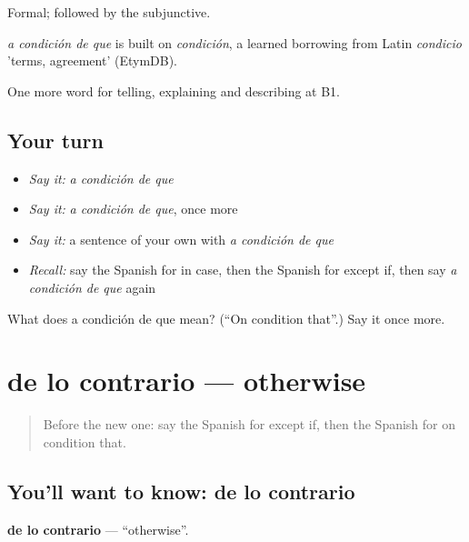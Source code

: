 Formal; followed by the subjunctive.

\begin{cousinweb}
\emph{a condición de que} is built on \emph{condición}, a learned borrowing from Latin \emph{condicio} 'terms, agreement' (EtymDB).
\end{cousinweb}

\begin{grammarlens}[title={What you've built}]
One more word for telling, explaining and describing at B1.
\end{grammarlens}

\subsection*{Your turn}
\begin{itemize}
\raggedright
  \item \emph{Say it:} \emph{a condición de que}
  \item \emph{Say it:} \emph{a condición de que}, once more
  \item \emph{Say it:} a sentence of your own with \emph{a condición de que}
  \item \emph{Recall:} say the Spanish for in case, then the Spanish for except if, then say \emph{a condición de que} again
\end{itemize}

\begin{tcolorbox}[breakable,colback=teal!4,colframe=teal!35!black,title={Before you move on}]
What does a condición de que mean? (\textquotedblleft{}On condition that\textquotedblright{}.) Say it once more.
\end{tcolorbox}
\section[de lo contrario]{de lo contrario — otherwise}

\label{lesson:ES-C612-de-lo-contrario}



\begin{quote}
Before the new one: say the Spanish for except if, then the Spanish for on condition that.
\end{quote}

\subsection*{You'll want to know: de lo contrario}
\textbf{de lo contrario} — \textquotedblleft{}otherwise\textquotedblright{}.

